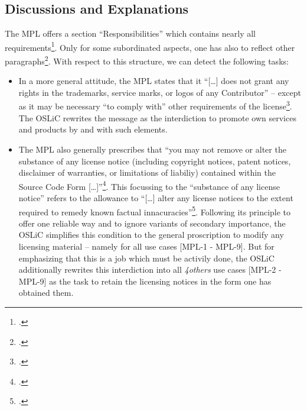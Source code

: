 \subsection{Discussions and Explanations}

The MPL offers a section \enquote{Responsibilities} which contains nearly all
requirements\footcite[cf.][\nopage wp\ §3]{Mpl20OsiLicense2013a}. Only for some
subordinated aspects, one has also to reflect other paragraphs\footcite[pars
pro to cf.][\nopage wp\ §3 - concerning the trademarks]{Mpl20OsiLicense2013a}.
With respect to this structure, we can detect the following tasks:

\begin{itemize}

  \item In a more general attitude, the MPL states that it \enquote{[\ldots]
  does not grant any rights in the trademarks, service marks, or logos of any
  Contributor} -- except as it may be necessary \enquote{to comply with} other
  requirements of the license\footcite[cf.][\nopage wp\
  §2.3]{Mpl20OsiLicense2013a}. The OSLiC rewrites the message as the
  interdiction to promote own services and products by and with such elements.
  
  \item The MPL also generally prescribes that \enquote{you may not remove or
  alter the substance of any license notice (including copyright notices, patent
  notices, disclaimer of warranties, or limitations of liabiliy) contained
  within the Source Code Form [\ldots]}\footcite[cf.][\nopage wp\
  §3.4]{Mpl20OsiLicense2013a}. This focussing to the \enquote{substance of any
  license notice} refers to the allowance to \enquote{[\ldots] alter any license
  notices to the extent required to remedy known factual
  innacuracies}\footcite[cf.][\nopage wp\ §3.4]{Mpl20OsiLicense2013a}.
  Following its principle to offer one reliable way and to ignore variants of
  secondary importance, the OSLiC simplifies this condition to the general
  proscription to modify any licensing material -- namely for all use cases
  [MPL-1 - MPL-9]. But for emphasizing that this is a job which must be activily
  done, the OSLiC additionally rewrites this interdiction into all
  \emph{4others} use cases [MPL-2 - MPL-9] as the task to retain the licensing
  notices in the form one has obtained them.
  

\end{itemize}
